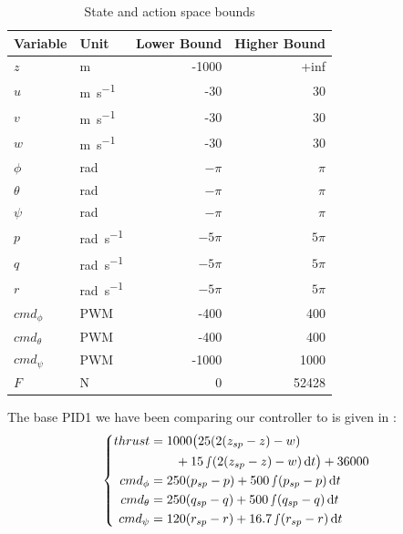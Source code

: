 \documentclass[anonymous=true,format=sigconf, screen=true, review=false]{acmart}
\begin{document}


\begin{table}[H]
    \centering
    \begin{tabular}{@{}llrr@{}}
        \toprule
        Variable & Unit & Lower Bound & Higher Bound \\
        \midrule
        $z$ & \si{m} & -1000 & +inf\\
        $u$ & \si{m.s^{-1}} & {-30}  & {30}\\
        $v$ & \si{m.s^{-1}} &  {-30 }& {30}\\
        $w$ & \si{m.s^{-1}} & {-30}  & {30}\\ 
        $\phi$   & \si{\radian} & ${-\pi}$ & ${\pi}$\\
        $\theta$ & \si{\radian} & ${-\pi}$ & ${\pi}$\\
        $\psi$   & \si{\radian} & ${-\pi}$ & ${\pi}$\\
        $p$ & \si{\radian.s^{-1}} & ${-5\pi}$ & ${5\pi}$\\
        $q$ & \si{\radian.s^{-1}} & ${-5\pi}$ & ${5\pi}$\\
        $r$ & \si{\radian.s^{-1}} & ${-5\pi}$ & ${5\pi}$\\
        $cmd_\phi$   & PWM & -400 & 400\\
        $cmd_\theta$ & PWM & -400 & 400\\
        $cmd_\psi$   & PWM & -1000 & 1000\\
        $F$ & \si{\newton} & 0 & 52428\\
        \bottomrule
    \end{tabular}
    \caption{State and action space bounds}
    \label{params1}
\end{table}

The base PID1 we have been comparing our controller to is given in \cite{goubault_putot}:
\begin{equation}
\label{eq:control1}
\left\{
\begin{aligned}
thrust &= 1000 \big(25(2(z_{sp} - z) - w) \\ & \qquad + 15 \smallint (2(z_{sp} - z) - w)\,\mathrm{d}t\big) + 36000 \\
cmd_{\phi} &= 250 (p_{sp} - p) +  500 \smallint (p_{sp} - p) \,\mathrm{d}t \\
cmd_{\theta} &= 250 (q_{sp} - q) +  500 \smallint (q_{sp} - q) \,\mathrm{d}t \\
cmd_{\psi} &= 120 (r_{sp} - r) + 16.7 \smallint (r_{sp} - r) \,\mathrm{d}t
\end{aligned}
\right.
\end{equation}
\end{document}
